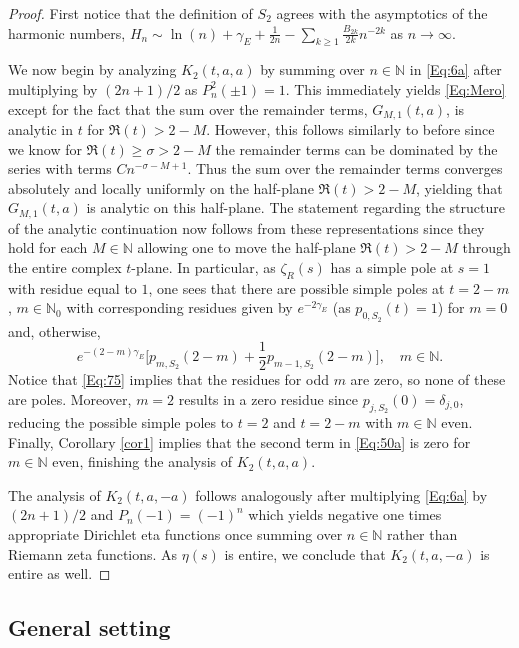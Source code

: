 \documentclass[letterpaper,10pt]{amsart}
\numberwithin{equation}{section}
\begin{document}
\begin{proof}
First notice that the definition of $S_2$ agrees with the asymptotics of the harmonic numbers, $H_n \sim \ln(n) +\gamma_E+\frac{1}{2n}-\sum_{k\geq 1}\frac{B_{2k}}{2k}n^{-2k}$ as $n \rightarrow \infty$.

We now begin by analyzing $K_2(t,a,a)$ by summing over $n\in\mathbb{N}$ in \eqref{Eq:6a} after multiplying by $(2n+1)/2$ as $P^2_n(\pm1)=1$. This immediately yields \eqref{Eq:Mero} except for the fact that the sum over the remainder terms, $G_{M,1}(t,a)$, is analytic in $t$ for $\Re(t)>2-M$. However, this follows similarly to before since we know for $\Re(t)\geq\sigma>2-M$ the remainder terms can be dominated by the series with terms $C n^{-\sigma-M+1}$. Thus the sum over the remainder terms converges absolutely and locally uniformly on the half-plane $\Re(t)>2-M$, yielding that $G_{M,1}(t,a)$ is analytic on this half-plane. The statement regarding the structure of the analytic continuation now follows from these representations since they hold for each $M\in\mathbb{N}$ allowing one to move the half-plane $\Re(t)>2-M$ through the entire complex $t$-plane. In particular, as $\zeta_R(s)$ has a simple pole at $s=1$ with residue equal to $1$, one sees that there are possible simple poles at $t=2-m$, $m\in\mathbb{N}_0$ with corresponding residues given by $e^{-2\gamma_E}$ (as $p_{0,S_2}(t)=1$) for $m=0$ and, otherwise,
    \begin{equation}\label{Eq:50a}
    e^{-(2-m)\gamma_E}\bigg[p_{m,S_2}(2-m)+\frac{1}{2}p_{m-1,S_2}(2-m)\bigg],\quad m\in\mathbb{N}.
    \end{equation}
Notice that \eqref{Eq:75} implies that the residues for odd $m$ are zero, so none of these are poles. Moreover, $m=2$ results in a zero residue since $p_{j,S_2}(0)=\delta_{j,0}$, reducing the possible simple poles to $t=2$ and $t=2-m$ with $m\in\mathbb{N}$ even.
Finally, Corollary \ref{cor1} implies that the second term in \eqref{Eq:50a} is zero for $m\in\mathbb{N}$ even, finishing the analysis of $K_2(t,a,a)$.

The analysis of $K_2(t,a,-a)$ follows analogously after multiplying \eqref{Eq:6a} by $(2n+1)/2$ and $P_n(-1)=(-1)^n$ which yields negative one times appropriate Dirichlet eta functions once summing over $n\in\mathbb{N}$ rather than Riemann zeta functions. As $\eta(s)$ is entire, we conclude that $K_2(t,a,-a)$ is entire as well.
\end{proof}

\subsection{General setting}
\end{document}
